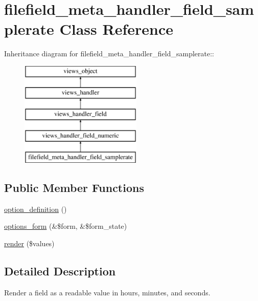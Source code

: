 \hypertarget{classfilefield__meta__handler__field__samplerate}{
\section{filefield\_\-meta\_\-handler\_\-field\_\-samplerate Class Reference}
\label{classfilefield__meta__handler__field__samplerate}
}
Inheritance diagram for filefield\_\-meta\_\-handler\_\-field\_\-samplerate::\begin{figure}[H]
\begin{center}
\leavevmode
\includegraphics[height=5cm]{classfilefield__meta__handler__field__samplerate}
\end{center}
\end{figure}
\subsection*{Public Member Functions}
\begin{CompactItemize}
\item 
\hyperlink{classfilefield__meta__handler__field__samplerate_007d94cba3f5de5e8e0c78e8b3b1ef5a}{option\_\-definition} ()
\item 
\hyperlink{classfilefield__meta__handler__field__samplerate_7ca6744f5ce24aea26f093027538d5ac}{options\_\-form} (\&\$form, \&\$form\_\-state)
\item 
\hyperlink{classfilefield__meta__handler__field__samplerate_8dd9fcfcf352e9699f02deed43a60e2c}{render} (\$values)
\end{CompactItemize}


\subsection{Detailed Description}
Render a field as a readable value in hours, minutes, and seconds. 

